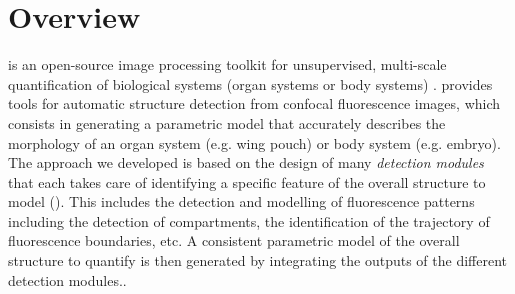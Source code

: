 \section{Overview}
\wingj is an open-source image processing toolkit for unsupervised, multi-scale quantification of biological systems (organ systems or body systems) \autocite{schaffter2013}. \wingj provides tools for automatic structure detection from confocal fluorescence images, which consists in generating a parametric model that accurately describes the morphology of an organ system (e.g. \droso wing pouch) or body system (e.g. \droso embryo). The approach we developed is based on the design of many \emph{detection modules} that each takes care of identifying a specific feature of the overall structure to model (). This includes the detection and modelling of fluorescence patterns including the detection of compartments, the identification of the trajectory of fluorescence boundaries, etc. A consistent parametric model of the overall structure to quantify is then generated by integrating the outputs of the different detection modules..\\



